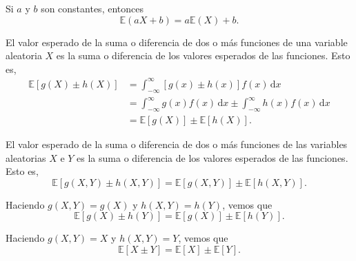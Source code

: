 \begin{theorem}[]
Si $a$ y $b$ son constantes, entonces
\begin{equation*}
\mathds{E}\left(aX+b\right)=a\mathds{E}\left(X\right)+b.
\end{equation*}
\end{theorem}

\begin{theorem}[]
El valor esperado de la suma o diferencia de dos o más funciones de una variable aleatoria $X$ es la suma o diferencia de los valores esperados de las funciones. Esto es,
\begin{align*}
\mathds{E}\left[g(X)\pm h(X)\right]
&=\int_{-\infty}^{\infty}\left[g(x)\pm h(x)\right]f(x)\,\mathrm{d}x \\
&=\int_{-\infty}^{\infty}g(x)f(x)\,\mathrm{d}x\pm \int_{-\infty}^{\infty}h(x)f(x)\,\mathrm{d}x\\
&=\mathds{E}\left[g(X)\right]\pm \mathds{E}\left[h(X)\right].
\end{align*}
\end{theorem}


\begin{theorem}[]
El valor esperado de la suma o diferencia de dos o más funciones de las variables aleatorias $X$ e $Y$ es la suma o diferencia de los valores esperados de las funciones. Esto es,
\begin{equation*}
\mathds{E}\left[g\left(X,Y\right)\pm h\left(X,Y\right)\right]=\mathds{E}\left[g\left(X,Y\right)\right]\pm\mathds{E}\left[h\left(X,Y\right)\right].
\end{equation*}
\end{theorem}

\begin{corollary}[]
Haciendo $g\left(X,Y\right)=g(X)$ y $h\left(X,Y\right)=h(Y)$, vemos que
\begin{equation*}
\mathds{E}\left[g\left(X\right)\pm h\left(Y\right)\right]=\mathds{E}\left[g\left(X\right)\right]\pm\mathds{E}\left[h\left(Y\right)\right].
\end{equation*}
\end{corollary}

\begin{corollary}[]
Haciendo $g\left(X,Y\right)=X$ y $h\left(X,Y\right)=Y$, vemos que
\begin{equation*}
\mathds{E}\left[X\pm Y\right]=\mathds{E}\left[X\right]\pm\mathds{E}\left[Y\right].
\end{equation*}
\end{corollary}

